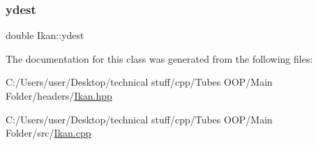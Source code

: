 \mbox{\label{class_ikan_ac338da0dc5dd61ec09b279200f94d328}} 
\subsubsection{\texorpdfstring{ydest}{ydest}}
{\footnotesize\ttfamily double Ikan\+::ydest\hspace{0.3cm}{\ttfamily [protected]}}



The documentation for this class was generated from the following files\+:\begin{DoxyCompactItemize}
\item 
C\+:/\+Users/user/\+Desktop/technical stuff/cpp/\+Tubes O\+O\+P/\+Main Folder/headers/\mbox{\hyperlink{_ikan_8hpp}{Ikan.\+hpp}}\item 
C\+:/\+Users/user/\+Desktop/technical stuff/cpp/\+Tubes O\+O\+P/\+Main Folder/src/\mbox{\hyperlink{_ikan_8cpp}{Ikan.\+cpp}}\end{DoxyCompactItemize}
